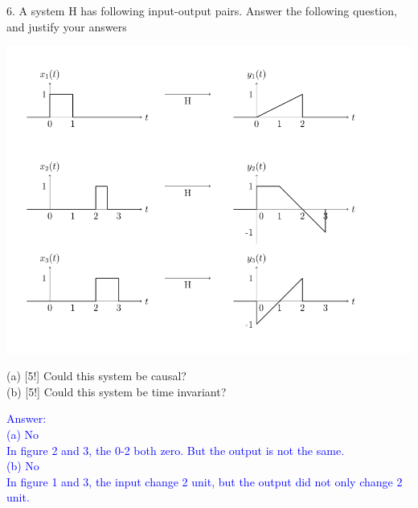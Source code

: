 \documentclass[12pt,a4paper]{article}
\begin{document}
\begin{tcolorbox}[colback = white]
6. A system H has following input-output pairs. Answer the following question, and justify your answers\\
\begin{center}
\includegraphics[scale=0.45]{problem6.png}
\end{center}
(a) [5!] Could this system be causal?\\
(b) [5!] Could this system be time invariant?
\end{tcolorbox}

\begin{tcolorbox}
\normalsize
\textcolor{blue}{Answer:\\
(a) No\\
In figure 2 and 3, the 0-2 both zero. But the output is not the same.\\
(b) No\\
In figure 1 and 3, the input change 2 unit, but the output did not only change 2 unit.
}
\end{tcolorbox}
\end{document}
